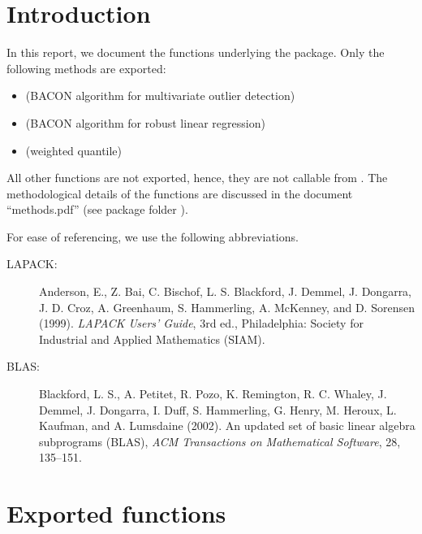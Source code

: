 \documentclass[a4paper,oneside,10pt,DIV=12]{scrreprt}
\begin{document}
\date{{\small \today, version 0.3}}
\maketitle

\tableofcontents

\chapter{Introduction}
In this report, we document the  functions underlying the 
 package. Only the following methods are exported:
\begin{itemize}
	\item {} (BACON algorithm for multivariate 
		outlier detection)
	\item {} (BACON algorithm for robust
		linear regression)
	\item {} (weighted quantile) 
\end{itemize}

\noindent All other functions are not exported, hence, they are not callable
from . The methodological details of the functions are discussed in the
document ``methods.pdf'' (see package folder ).

For ease of referencing, we use the following abbreviations. 
\begin{description}
	\item[\small{LAPACK}:] Anderson, E., Z. Bai, C. Bischof, L. S. Blackford,
J. Demmel, J. Dongarra, J. D. Croz, A. Greenhaum, S. Hammerling, A. McKenney,
and D. Sorensen (1999). \textit{LAPACK Users’ Guide}, 3rd ed., Philadelphia:
Society for Industrial and Applied Mathematics (SIAM).
	\item[\small{BLAS}:] Blackford, L. S., A. Petitet, R. Pozo, K. Remington,
R. C. Whaley, J. Demmel, J. Dongarra, I. Duff, S. Hammerling, G. Henry, 
M. Heroux, L. Kaufman, and A. Lumsdaine (2002). An updated set of basic linear
algebra subprograms (BLAS), \textit{ACM Transactions on Mathematical Software},
28, 135--151.
\end{description}



\chapter{Exported functions}
\end{document}
